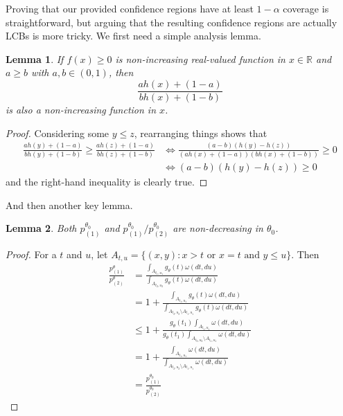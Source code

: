 \documentclass{article}
\newtheorem{lemma}{Lemma}
\newcommand{\R}{\mathbb{R}}
\begin{document}
\begin{appendix}
Proving that our provided confidence regions have at least $1-\alpha$ coverage is straightforward, but arguing that the resulting confidence regions are actually LCBs is more tricky. We first need a simple analysis lemma. 

\begin{lemma}
    \label{lem:analysis}
    If $f(x) \geq 0$ is non-increasing real-valued function in $x\in \R$ and $a \geq b$ with $a, b \in (0, 1)$, then 
    \begin{equation}
        \frac{a h(x) + (1-a)}{b h(x) + (1-b)}
    \end{equation}
    is also a non-increasing function in $x$.
\end{lemma}
\begin{proof}
    Considering some $y \leq z$, rearranging things shows that 
    \begin{align*}
        \frac{a h(y) + (1-a)}{b h(y) + (1-b)} \geq \frac{a h(z) + (1-a)}{b h(z) + (1-b)} &\iff \frac{(a - b)(h(y) - h(z)) }{(ah(x) + (1-a))(b h(x) + (1-b))} \geq 0\\
        &\iff (a - b)(h(y) - h(z)) \geq 0
    \end{align*}
    and the right-hand inequality is clearly true. 
\end{proof}

And then another key lemma. 

\begin{lemma}
    Both $p^{\theta_0}_{(1)}$ and $p^{\theta_0}_{(1)}/p^{\theta_0}_{(2)}$ are non-decreasing in $\theta_0$.  
\end{lemma}

\begin{proof}
    For a $t$ and $u$, let $A_{t, u} = \{(x, y) : x > t \text{ or } x = t \text{ and } y \leq u \}$. Then  
    \begin{align*}
        \frac{p^{\theta}_{(1)}}{p^{\theta}_{(2)}} &= \frac{ \int_{A_{t_1, u_1}}  g_{\theta}(t) \omega(dt, du)}{ \int_{A_{t_2, u_2}} g_{\theta}(t) \omega(dt, du)} \\
        &= 1 + \frac{ \int_{A_{t_1, u_1}}  g_{\theta}(t) \omega(dt, du)}{ \int_{A_{t_2, u_2} \setminus A_{t_1, u_1}} g_{\theta}(t) \omega(dt, du)} \\
        &\leq 1 + \frac{ g_{\theta}(t_1) \int_{A_{t_1, u_1}}   \omega(dt, du)}{ g_{\theta}(t_1)\int_{A_{t_2, u_2} \setminus A_{t_1, u_1}}  \omega(dt, du)} \\
        &= 1 + \frac{ \int_{A_{t_1, u_1}}   \omega(dt, du)}{ \int_{A_{t_2, u_2} \setminus A_{t_1, u_1}}  \omega(dt, du)} \\
        &=  \frac{p^{\theta_0}_{(1)}}{p^{\theta_0}_{(2)}}
    \end{align*}
\end{proof}


\end{appendix}
\end{document}
